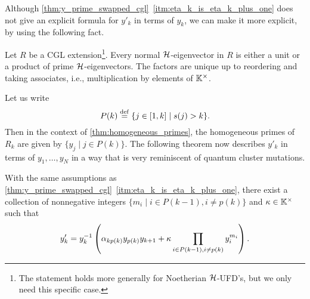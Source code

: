 Although \cref{thm:y_prime_swapped_cgl}~\ref*{itm:eta_k_is_eta_k_plus_one} does not
give an explicit formula for $y'_k$ in terms of $y_k$, we can make it more explicit, by
using the following fact.
\begin{theorem}\label{thm:normal_in_UFD}
	Let $R$ be a CGL extension\footnote{The statement holds more generally for Noetherian
		$\mathcal{H}$-UFD's, but we only need this specific case.}. Every normal $\mathcal{H}$-eigenvector in
	$R$ is either a unit or a product of prime $\mathcal{H}$-eigenvectors. The factors are unique
	up to reordering and taking associates, i.e., multiplication by
	elements of $\mathbb{K}^\times$.
\end{theorem}
Let us write
\begin{equation}\label{eq:P_of_k}
	P(k) \overset{\mathrm{def}}{=} \{j \in [1,  k] \mid s(j) > k\}.
\end{equation}
%
Then in the context of \cref{thm:homogeneous_primes}, the homogeneous primes of $R_k$
are given by $\{y_j \mid j \in P(k)\}$. The following theorem now describes $y'_k$ in
terms of $y_1, \dots, y_N$ in a way that is very reminiscent of quantum cluster
mutations.
\begin{theorem}\label{thm:almost_cluster_mutation}
	With the same assumptions as
	\cref{thm:y_prime_swapped_cgl}~\ref*{itm:eta_k_is_eta_k_plus_one}, there exist a
	collection of nonnegative integers $\{m_i \mid i \in P(k-1), i\neq p(k)\}$ and $\kappa
		\in \mathbb{K}^\times$ such that
	\begin{equation*}
		y'_k = y_k^{-1} \left(\alpha_{kp(k)}y_{p(k)}y_{k+1} + \kappa \prod_{i \in P(k-1), i\neq p(k)} y_i^{m_i}\right).
	\end{equation*}
\end{theorem}
